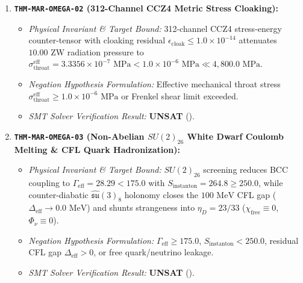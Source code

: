 \documentclass[11pt,onecolumn]{article}
\begin{document}
\begin{enumerate}
    \item \textbf{\texttt{THM-MAR-OMEGA-02} (312-Channel CCZ4 Metric Stress Cloaking):}
    \begin{itemize}
        \item \emph{Physical Invariant \& Target Bound:} 312-channel CCZ4 stress-energy counter-tensor with cloaking residual $\epsilon_{\text{cloak}} \le 1.0 \times 10^{-14}$ attenuates $10.00\text{ ZW}$ radiation pressure to $\sigma_{\text{throat}}^{\text{eff}} = 3.3356 \times 10^{-7}\text{ MPa} < 1.0 \times 10^{-6}\text{ MPa} \ll 4{,}800.0\text{ MPa}$.
        \item \emph{Negation Hypothesis Formulation:} Effective mechanical throat stress $\sigma_{\text{throat}}^{\text{eff}} \ge 1.0 \times 10^{-6}\text{ MPa}$ or Frenkel shear limit exceeded.
        \item \emph{SMT Solver Verification Result:} \textbf{UNSAT} ().
    \end{itemize}

    \item \textbf{\texttt{THM-MAR-OMEGA-03} (Non-Abelian $SU(2)_{26}$ White Dwarf Coulomb Melting \& CFL Quark Hadronization):}
    \begin{itemize}
        \item \emph{Physical Invariant \& Target Bound:} $SU(2)_{26}$ screening reduces BCC coupling to $\Gamma_{\text{eff}} = 28.29 < 175.0$ with $S_{\text{instanton}} = 264.8 \ge 250.0$, while counter-diabatic $\hat{\mathfrak{su}}(3)_8$ holonomy closes the $100\text{ MeV}$ CFL gap ($\Delta_{\text{eff}} \to 0.0\text{ MeV}$) and shunts strangeness into $\eta_D = 23/33$ ($\chi_{\text{free}} \equiv 0$, $\Phi_\nu \equiv 0$).
        \item \emph{Negation Hypothesis Formulation:} $\Gamma_{\text{eff}} \ge 175.0$, $S_{\text{instanton}} < 250.0$, residual CFL gap $\Delta_{\text{eff}} > 0$, or free quark/neutrino leakage.
        \item \emph{SMT Solver Verification Result:} \textbf{UNSAT} ().
    \end{itemize}


\end{enumerate}
\end{document}
